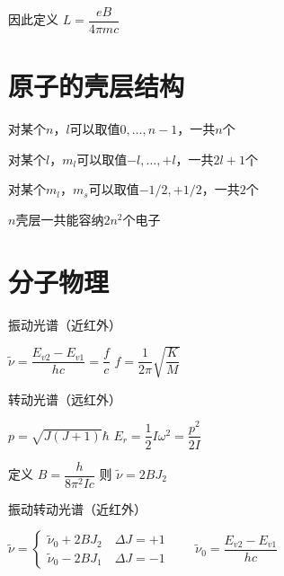 \documentclass{article}
\begin{document}
\begin{multicols}{2}
因此定义 $L = \dfrac{eB}{4 \pi m c} $

\section{原子的壳层结构}

对某个$n$，$l$可以取值$0,\dots,n-1$，一共$n$个

对某个$l$，$m_l$可以取值$-l,\dots,+l$，一共$2l+1$个

对某个$m_l$，$m_s$可以取值$-1/2,+1/2$，一共$2$个

$n$壳层一共能容纳$2n^2$个电子

\section{分子物理}

振动光谱（近红外）

$\tilde{\nu} = \dfrac{E_{v2} - E_{v1}}{hc} = \dfrac{f}{c} $ \quad $f = \dfrac{1}{2\pi} \sqrt{\dfrac{K}{M} } $ 

转动光谱（远红外）

$p = \sqrt{J \left( J + 1 \right)} \hbar$ \quad $E_r = \dfrac{1}{2} I \omega^2 = \dfrac{p^2}{2I}  $ 

定义 $B=\dfrac{h}{8 \pi^2 I c} $ 则 $\tilde{\nu} = 2 B J_2$

振动转动光谱（近红外）

$\tilde{\nu} = \left\{
\begin{aligned}
  \tilde{\nu}_0 + 2 B J_2 \quad \Delta J = + 1 \\
  \tilde{\nu}_0 - 2 B J_1 \quad \Delta J = - 1
\end{aligned}
\right.
\quad\quad
\tilde{\nu}_0 = \dfrac{E_{v2} - E_{v1}}{hc} 
$
\end{multicols}
\end{document}
